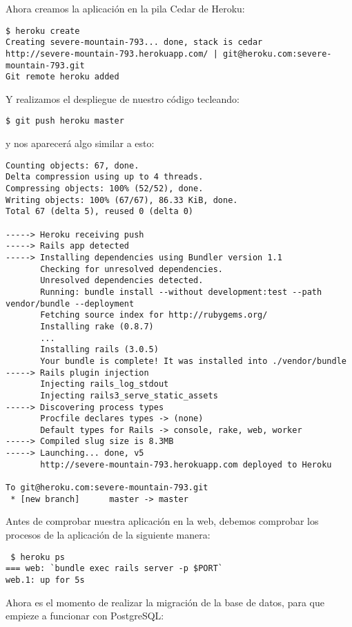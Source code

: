 Ahora creamos la aplicación en la pila Cedar de Heroku:

\begin{verbatim}
$ heroku create
Creating severe-mountain-793... done, stack is cedar
http://severe-mountain-793.herokuapp.com/ | git@heroku.com:severe-mountain-793.git
Git remote heroku added
\end{verbatim}

Y realizamos el despliegue de nuestro código tecleando:

\begin{verbatim}
$ git push heroku master
\end{verbatim}

y nos aparecerá algo similar a esto:

\begin{verbatim}
Counting objects: 67, done.
Delta compression using up to 4 threads.
Compressing objects: 100% (52/52), done.
Writing objects: 100% (67/67), 86.33 KiB, done.
Total 67 (delta 5), reused 0 (delta 0)

-----> Heroku receiving push
-----> Rails app detected
-----> Installing dependencies using Bundler version 1.1
       Checking for unresolved dependencies.
       Unresolved dependencies detected.
       Running: bundle install --without development:test --path vendor/bundle --deployment
       Fetching source index for http://rubygems.org/
       Installing rake (0.8.7)
       ...
       Installing rails (3.0.5)
       Your bundle is complete! It was installed into ./vendor/bundle
-----> Rails plugin injection
       Injecting rails_log_stdout
       Injecting rails3_serve_static_assets
-----> Discovering process types
       Procfile declares types -> (none)
       Default types for Rails -> console, rake, web, worker
-----> Compiled slug size is 8.3MB
-----> Launching... done, v5
       http://severe-mountain-793.herokuapp.com deployed to Heroku

To git@heroku.com:severe-mountain-793.git
 * [new branch]      master -> master
\end{verbatim}

Antes de comprobar nuestra aplicación en la web, debemos comprobar los procesos de la aplicación de la siguiente manera:

\begin{verbatim}
 $ heroku ps
=== web: `bundle exec rails server -p $PORT`
web.1: up for 5s
\end{verbatim}

Ahora es el momento de realizar la migración de la base de datos, para que empieze a funcionar con PostgreSQL:

